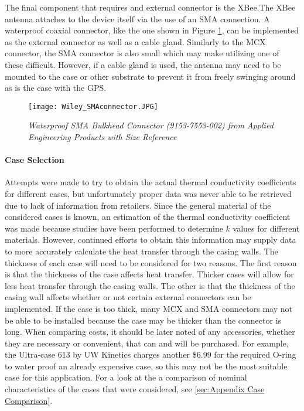 The final component that requires and external connector is the XBee.The XBee antenna attaches to the device itself via the use of an SMA connection. A
waterproof coaxial connector, like the one shown in Figure \ref{fig:SMA}, can be implemented as the external connector as well as a cable gland. 
Similarly to the MCX connector, the SMA connector is also small which may make utilizing one of these difficult. However, if a cable gland is used, the
antenna may need to be mounted to the case or other substrate to prevent it from freely swinging around as is the case with the GPS.
\begin{figure}[ht]
\centering
\texttt{[image: Wiley\_SMAconnector.JPG]}
\caption{\textit{Waterproof SMA Bulkhead Connector (9153-7553-002) from Applied Engineering Products with Size Reference}}
\label{fig:SMA} 
\end{figure}



\paragraph {Case Selection} Attempts were made to try to obtain the actual thermal conductivity coefficients for different cases, but unfortunately proper
data was never able to be retrieved due to lack of information from retailers. Since the general material of the considered cases is known, an
estimation of the thermal conductivity coefficient was made because studies have been performed to determine $k$ values for different materials. 
However, continued efforts to obtain this information may supply data to more accurately calculate the heat transfer through the casing walls. The
thickness of each case will need to be considered for two reasons. The first reason is that the thickness of the case affects heat transfer. Thicker
cases will allow for less heat transfer through the casing walls. The other is that the thickness of the casing wall affects whether or not certain
external connectors can be implemented. If the case is too thick, many MCX and SMA connectors may not be able to be installed because the case may
be thicker than the connector is long. When comparing costs, it should be later noted of any accessories, whether they are necessary or
convenient, that can and will be purchased. For example, the Ultra-case 613 by UW Kinetics charges another \$6.99 for the required O-ring to
water proof an already expensive case, so this may not be the most suitable case for this application. For a look at the a comparison of nominal
characteristics of the cases that were considered, see \ref{sec:Appendix Case Comparison}.

